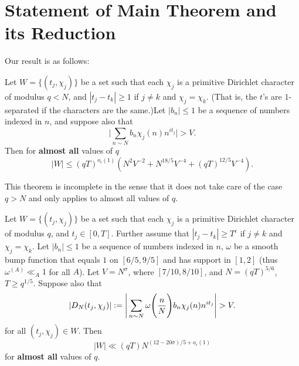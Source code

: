 \section{Statement of Main Theorem and its Reduction}
Our result is as follows: 
\begin{theorem}\label{incompletehybrid}
	Let $W=\{(t_j,\chi_j)\}$ be a set such that each $\chi_j$ is a primitive Dirichlet character of modulus $q<N$, and $|t_j-t_k|\geq 1$ if $j\neq k$ and $\chi_j=\chi_k$. (That is, the $t$'s are $1$-separated if the characters are the same.)Let $|b_n|\leq 1$ be a sequence of numbers indexed in $n$, and suppose also that \[
	\Bigg|\sum_{n\sim N} b_n\chi_j(n)n^{it_j} \Bigg|>V.
	\]
	Then for \textbf{almost all} values of $q$ \[
	|W|\leq (qT)^{o_\epsilon(1)}(N^2V^{-2}+ N^{18/5}V^{-4}+(qT)^{12/5}V^{-4} ).
	\]
\end{theorem}
\begin{remark}
This theorem is incomplete in the sense that it does not take care of the case $q>N$ and only applies to almost all values of $q$.
\end{remark}
\begin{proposition}\label{mainthm}
    Let $W=\{(t_j,\chi_j)\}$ be a set such that each $\chi_j$ is a primitive Dirichlet character of modulus $q$, and $t_j\in[0,T]$. Further assume that $|t_j-t_k|\geq T^\epsilon$ if $j\neq k$ and $\chi_j=\chi_k$. Let $|b_n|\leq 1$ be a sequence of numbers indexed in $n$, $\omega$ be a smooth bump function that equals $1$ on $[6/5,9/5]$ and has support in $[1,2]$ (thus $\omega^{(A)}\ll_A 1$ for all $A$). Let $V=N^{\sigma}$, where $[7/10,8/10]$, and $N=(qT)^{5/6}$, $T\geq q^{1/5}$. Suppose also that \[
    |D_N(t_j,\chi_j)|\defeq\Bigg|\sum_{n\sim N} \omega\Bigg(\frac{n}{N}\Bigg)b_n\chi_j(n)n^{it_j} \Bigg|>V.
\]
for all $(t_j,\chi_j)\in W$.
Then \[
|W|\ll (qT)N^{(12-20\sigma)/5+o_{\epsilon}(1)}
\]
for \textbf{almost all} values of $q$.
\end{proposition}
